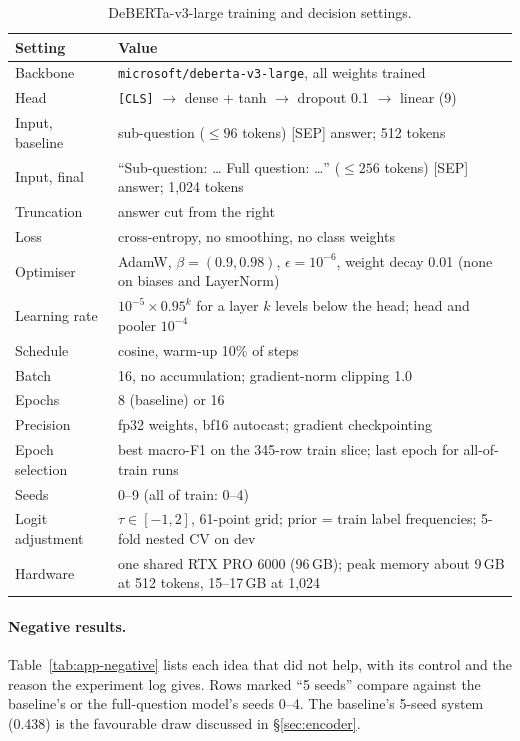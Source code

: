 \begin{table}[t]
\centering
\footnotesize
\begin{tabular}{@{}lp{}@{}}
\toprule
Setting & Value \tabularnewline
\midrule
Backbone & \raggedright \texttt{microsoft/deberta-v3-large}, all weights trained \tabularnewline
Head & \raggedright \texttt{[CLS]} $\to$ dense + tanh $\to$ dropout 0.1 $\to$ linear (9) \tabularnewline
Input, baseline & \raggedright sub-question (${\le}96$ tokens) [SEP] answer; 512 tokens \tabularnewline
Input, final & \raggedright ``Sub-question: \ldots{} Full question: \ldots'' (${\le}256$ tokens) [SEP] answer; 1,024 tokens \tabularnewline
Truncation & \raggedright answer cut from the right \tabularnewline
Loss & \raggedright cross-entropy, no smoothing, no class weights \tabularnewline
Optimiser & \raggedright AdamW, $\beta=(0.9, 0.98)$, $\epsilon=10^{-6}$, weight decay 0.01 (none on biases and LayerNorm) \tabularnewline
Learning rate & \raggedright $10^{-5}\times0.95^{k}$ for a layer $k$ levels below the head; head and pooler $10^{-4}$ \tabularnewline
Schedule & \raggedright cosine, warm-up 10\% of steps \tabularnewline
Batch & \raggedright 16, no accumulation; gradient-norm clipping 1.0 \tabularnewline
Epochs & \raggedright 8 (baseline) or 16 \tabularnewline
Precision & \raggedright fp32 weights, bf16 autocast; gradient checkpointing \tabularnewline
Epoch selection & \raggedright best macro-F1 on the 345-row train slice; last epoch for all-of-train runs \tabularnewline
Seeds & \raggedright 0--9 (all of train: 0--4) \tabularnewline
Logit adjustment & \raggedright $\tau\in[-1,2]$, 61-point grid; prior = train label frequencies; 5-fold nested CV on dev \tabularnewline
Hardware & \raggedright one shared RTX PRO 6000 (96\,GB); peak memory about 9\,GB at 512 tokens, 15--17\,GB at 1,024 \tabularnewline
\bottomrule
\end{tabular}
\caption{DeBERTa-v3-large training and decision settings.}
\label{tab:app-enc-hparams}
\end{table}

\paragraph{Negative results.}
Table~\ref{tab:app-negative} lists each idea that did not help, with its control and
the reason the experiment log gives. Rows marked ``5 seeds'' compare against the
baseline's or the full-question model's seeds 0--4. The baseline's 5-seed system
(0.438) is the favourable draw discussed in \S\ref{sec:encoder}.

